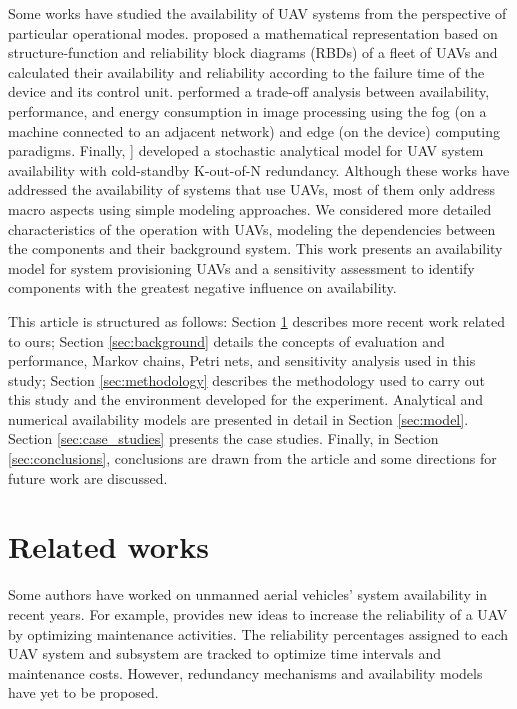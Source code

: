 \documentclass[conference]{IEEEtran}
\begin{document}
Some works have studied the availability of UAV systems from the perspective of particular operational modes. \citet{Zaitseva2020, rusnak2019reliability} proposed a mathematical representation based on structure-function and reliability block diagrams (RBDs) of a fleet of UAVs and calculated their availability and reliability according to the failure time of the device and its control unit. \citet{Machida2021, Report} performed a trade-off analysis between availability, performance, and energy consumption in image processing using the fog (on a machine connected to an adjacent network) and edge (on the device) computing paradigms. Finally, \citet{Maccarthy2019} ] developed a stochastic analytical model for UAV system availability with cold-standby K-out-of-N redundancy. Although these works have addressed the availability of systems that use UAVs, most of them only address macro aspects using simple modeling approaches. We considered more detailed characteristics of the operation with UAVs, modeling the dependencies between the components and their background system. This work presents an availability model for system provisioning UAVs and a sensitivity assessment to identify components with the greatest negative influence on availability.

This article is structured as follows: Section \ref{sec:related_works} describes more recent work related to ours; Section \ref{sec:background} details the concepts of evaluation and performance, Markov chains, Petri nets, and sensitivity analysis used in this study; Section \ref{sec:methodology} describes the methodology used to carry out this study and the environment developed for the experiment. Analytical and numerical availability models are presented in detail in Section \ref{sec:model}. Section \ref{sec:case_studies} presents the case studies. Finally, in Section \ref{sec:conclusions}, conclusions are drawn from the article and some directions for future work are discussed.


\section{Related works}\label{sec:related_works}

Some authors have worked on unmanned aerial vehicles’ system availability in recent years. For example,  \citet{Petritoli2017, Petritoli2018} provides new ideas to increase the reliability of a UAV by optimizing maintenance activities. The reliability percentages assigned to each UAV system and subsystem are tracked to optimize time intervals and maintenance costs. However, redundancy mechanisms and availability models have yet to be proposed.
\end{document}
